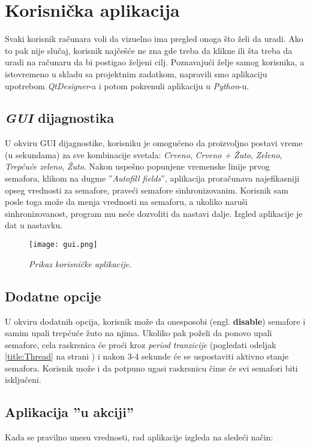 \documentclass[a4paper,12pt, projekat]{etf}
\begin{document}
\chapter{Korisnička aplikacija}
Svaki korisnik računara voli da vizuelno ima pregled onoga što želi da uradi. Ako to pak nije slučaj, korisnik najčešće ne zna gde treba da klikne ili šta treba da uradi na računaru da bi postigao željeni cilj. Poznavajući želje samog korisnika, a istovremeno u skladu sa projektnim zadatkom, napravili smo aplikaciju upotrebom \textit{QtDesigner}-a i potom pokrenuli aplikaciju u \textit{Python}-u.

\section{\textit{GUI} dijagnostika}
U okviru GUI dijagnostike, korisniku je omogućeno da proizvoljno postavi vreme (u sekundama) za sve kombinacije svetala: \textit{Crveno}, \textit{Crveno + Žuto}, \textit{Zeleno}, \textit{Trepćuće zeleno}, \textit{Žuto}. Nakon uspešno popunjene vremenske linije prvog semafora, klikom na dugme ''\textit{Autofill fields}'', aplikacija proračunava najefikasniji opseg vrednosti za semafore, praveći semafore sinhronizovanim. Korisnik sam posle toga može da menja vrednosti na semaforu, a ukoliko naruši sinhronizovanost, program mu neće dozvoliti da nastavi dalje. Izgled aplikacije je dat u nastavku.

\begin{figure}[htb]
\centering
\texttt{[image: gui.png]}
\caption{\emph{Prikaz korisničke aplikacije.}}
\label{fig:guipreview}
\end{figure}


\section{Dodatne opcije}
U okviru dodatnih opcija, korisnik može da onesposobi (engl. \textbf{disable}) semafore i samim upali trepćuće žuto na njima. Ukoliko pak poželi da ponovo upali semafore, cela raskrsnica će proći kroz \textit{period tranzicije} (pogledati odeljak \ref{title:Thread} na strani \pageref{title:Thread}) i nakon 3-4 sekunde će se uspostaviti aktivno stanje semafora. Korisnik može i da potpuno ugasi raskrsnicu čime će svi semafori biti isključeni.

\section{Aplikacija ''u akciji''}
Kada se pravilno unesu vrednosti, rad aplikacije izgleda na sledeći način:
\end{document}
